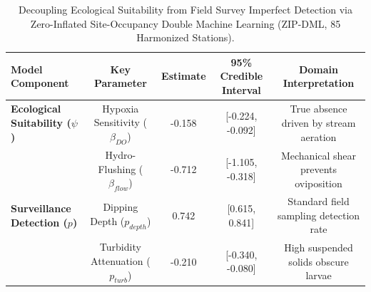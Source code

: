 \begin{table}[t]
\centering
\caption{Decoupling Ecological Suitability from Field Survey Imperfect Detection via Zero-Inflated Site-Occupancy Double Machine Learning (ZIP-DML, 85 Harmonized Stations).}
\label{tab:zip_occupancy}
\begin{tabular}{lcccc}
\toprule
\textbf{Model Component} & \textbf{Key Parameter} & \textbf{Estimate} & \textbf{95\% Credible Interval} & \textbf{Domain Interpretation} \\
\midrule
\textbf{Ecological Suitability ($\psi$)} & Hypoxia Sensitivity ($\beta_{DO}$) & -0.158 & [-0.224, -0.092] & True absence driven by stream aeration \\
                                        & Hydro-Flushing ($\beta_{flow}$)    & -0.712 & [-1.105, -0.318] & Mechanical shear prevents oviposition \\
\textbf{Surveillance Detection ($p$)}    & Dipping Depth ($p_{depth}$)        & 0.742  & [0.615, 0.841]   & Standard field sampling detection rate \\
                                        & Turbidity Attenuation ($p_{turb}$) & -0.210 & [-0.340, -0.080] & High suspended solids obscure larvae \\
\bottomrule
\end{tabular}
\end{table}
